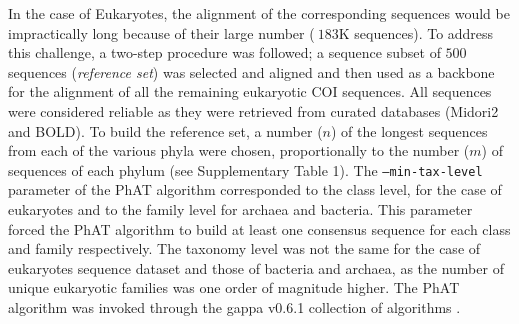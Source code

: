    In the case of Eukaryotes, the alignment of the corresponding sequences would be impractically long because of their large number ($~183$K sequences). 
   To address this challenge, a two-step procedure was followed; 
   a sequence subset of $500$ sequences (\textit{reference set}) was selected and aligned and then used as a backbone for the alignment of all the remaining eukaryotic COI sequences. 
   All sequences were considered reliable as they were retrieved from curated databases (Midori2 and BOLD). 
   To build the reference set, a number ($n$) of the longest sequences from each of the various phyla were chosen, proportionally to the number ($m$) of sequences of each phylum (see Supplementary Table 1). 
   The \texttt{--min-tax-level} parameter of the PhAT algorithm corresponded to the class level, for the case of eukaryotes and to the family level for archaea and bacteria. 
   This parameter forced the PhAT algorithm to build at least one consensus sequence for each class and family respectively. 
   The taxonomy level was not the same for the case of eukaryotes sequence dataset and those of bacteria and archaea, as the number of unique eukaryotic families was one order of magnitude higher. 
   The PhAT algorithm was invoked through the gappa v0.6.1 collection of algorithms \citep{czech2020genesis}.


